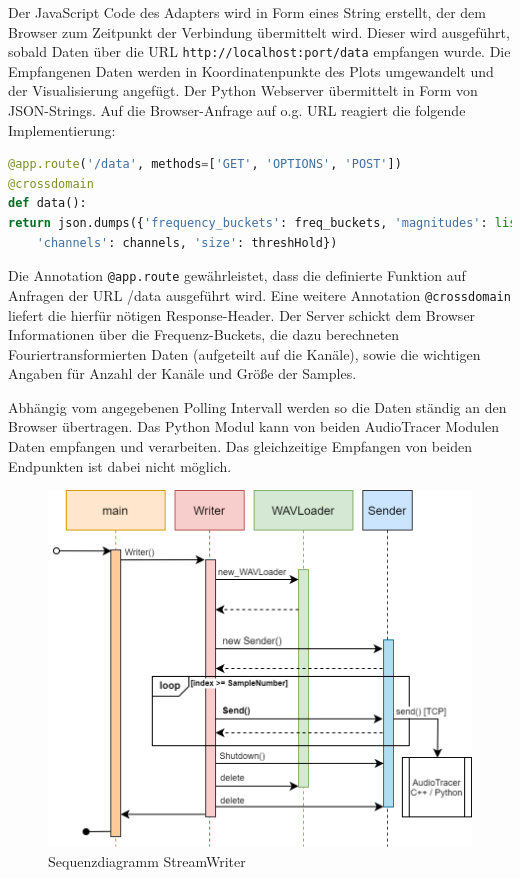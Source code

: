 Der JavaScript Code des Adapters wird in Form eines String erstellt, der dem Browser zum Zeitpunkt der Verbindung übermittelt wird. Dieser wird ausgeführt, sobald Daten über die URL \texttt{http://localhost:{port}/data} empfangen wurde. Die Empfangenen Daten werden in Koordinatenpunkte des Plots umgewandelt und der Visualisierung angefügt.
Der Python Webserver übermittelt in Form von JSON-Strings. Auf die Browser-Anfrage auf  o.g. URL reagiert die folgende Implementierung:

\begin{lstlisting}[language=Python, frame=none, numbers=none]
@app.route('/data', methods=['GET', 'OPTIONS', 'POST'])
@crossdomain
def data():
return json.dumps({'frequency_buckets': freq_buckets, 'magnitudes': list(magnitudeHolder),
	'channels': channels, 'size': threshHold})
\end{lstlisting}

Die Annotation \texttt{@app.route} gewährleistet, dass die definierte Funktion auf Anfragen der URL /data ausgeführt wird. Eine weitere Annotation \texttt{@crossdomain} liefert die hierfür nötigen Response-Header. Der Server schickt dem Browser Informationen über die Frequenz-Buckets, die dazu berechneten Fouriertransformierten Daten (aufgeteilt auf die Kanäle), sowie die wichtigen Angaben für Anzahl der Kanäle und Größe der Samples.

Abhängig vom angegebenen Polling Intervall werden so die Daten ständig an den Browser übertragen. Das Python Modul kann von beiden AudioTracer Modulen Daten empfangen und verarbeiten. Das gleichzeitige Empfangen von beiden Endpunkten ist dabei nicht möglich.

\begin{figure}[hbt!]
	\centering      
	\includegraphics[scale=0.5]{figures/StreamWriter_sequence_diagram.png}
	\caption{Sequenzdiagramm StreamWriter}
	\label{fig:Seq_StreamWriter}
\end{figure}


